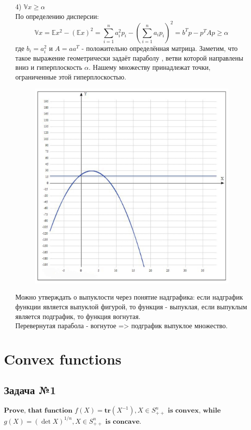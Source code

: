 \documentclass[12pt,letterpaper]{article}
\begin{document}
\begin{itemize}
	\item[4) ] $ \mathbb{V}x \ge \alpha $\\
По определению дисперсии: 
$$
\mathbb{V}x = \mathbb{E} x^2 - \left( \mathbb{E} x \right)^2 = \sum_{i=1}^{n} a_{i}^{2} p_{i}-\left(\sum_{i=1}^{n} a_{i} p_{i}\right)^{2}=b^{T} p-p^{T} A p \geqslant \alpha
$$
где $ b_{i}=a_{i}^{2} \text { и } A=a a^{T} $ - положительно определённая матрица. Заметим, что такое выражение геометрически задаёт параболу , ветви которой направлены вниз и гиперплоскость $ \alpha $. Нашему множеству принадлежат точки, ограниченные этой гиперплоскостью.
\begin{figure}[h!]
\begin{minipage}[h]{1\linewidth}
\begin{center}
\includegraphics[width=0.6\linewidth]{parab}
\end{center}
\end{minipage}
\end{figure}
Можно утверждать о выпуклости через понятие надграфика: если надграфик функции является выпуклой фигурой, то функция - выпуклая, если выпуклым является подграфик, то функция вогнутая.\\
Перевернутая парабола - вогнутое => подграфик выпуклое множество.
\end{itemize}

\newpage
\section{Convex functions}
\subsection*{Задача №1}
$\textbf{Prove, that function}$ $f(X) = \mathbf{tr}(X^{-1}), X \in S^n_{++}$ $\textbf{is convex, while}$ $g(X) = (\det X)^{1/n}, X \in S^n_{++}$ $\textbf{is concave.}$\\
\end{document}
